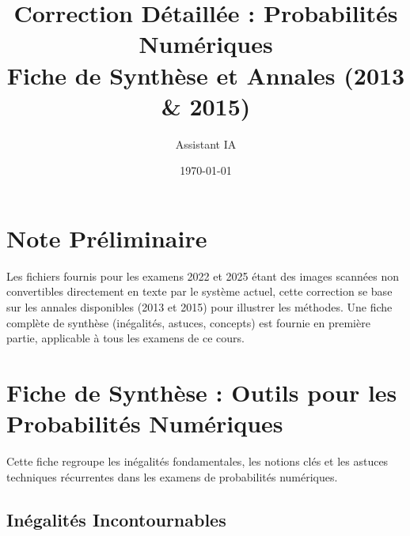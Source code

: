 \documentclass[a4paper,11pt]{article}
\title{\textbf{Correction Détaillée : Probabilités Numériques}\\
\large Fiche de Synthèse et Annales (2013 \& 2015)}
\author{Assistant IA}
\date{\today}
\begin{document}
\maketitle

\section*{Note Préliminaire}
Les fichiers fournis pour les examens 2022 et 2025 étant des images scannées non convertibles directement en texte par le système actuel, cette correction se base sur les annales disponibles (2013 et 2015) pour illustrer les méthodes. Une fiche complète de synthèse (inégalités, astuces, concepts) est fournie en première partie, applicable à tous les examens de ce cours.

\tableofcontents

\newpage

\section{Fiche de Synthèse : Outils pour les Probabilités Numériques}

Cette fiche regroupe les inégalités fondamentales, les notions clés et les astuces techniques récurrentes dans les examens de probabilités numériques.

\subsection{Inégalités Incontournables}
\end{document}
